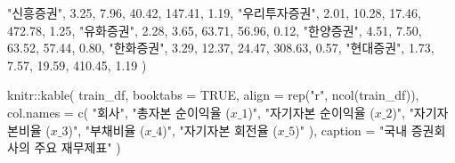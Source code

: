 \documentclass[
]{book}
\newenvironment{Shaded}{\begin{snugshade}}{\end{snugshade}}
\newcommand{\AttributeTok}[1]{\textcolor[rgb]{0.77,0.63,0.00}{#1}}
\newcommand{\ConstantTok}[1]{\textcolor[rgb]{0.00,0.00,0.00}{#1}}
\newcommand{\FloatTok}[1]{\textcolor[rgb]{0.00,0.00,0.81}{#1}}
\newcommand{\FunctionTok}[1]{\textcolor[rgb]{0.00,0.00,0.00}{#1}}
\newcommand{\NormalTok}[1]{#1}
\newcommand{\SpecialCharTok}[1]{\textcolor[rgb]{0.00,0.00,0.00}{#1}}
\newcommand{\StringTok}[1]{\textcolor[rgb]{0.31,0.60,0.02}{#1}}
\begin{document}
\begin{Shaded}
\begin{Highlighting}[]
  \StringTok{"신흥증권"}\NormalTok{, }\FloatTok{3.25}\NormalTok{, }\FloatTok{7.96}\NormalTok{, }\FloatTok{40.42}\NormalTok{, }\FloatTok{147.41}\NormalTok{, }\FloatTok{1.19}\NormalTok{,}
  \StringTok{"우리투자증권"}\NormalTok{, }\FloatTok{2.01}\NormalTok{, }\FloatTok{10.28}\NormalTok{, }\FloatTok{17.46}\NormalTok{, }\FloatTok{472.78}\NormalTok{, }\FloatTok{1.25}\NormalTok{,}
  \StringTok{"유화증권"}\NormalTok{, }\FloatTok{2.28}\NormalTok{, }\FloatTok{3.65}\NormalTok{, }\FloatTok{63.71}\NormalTok{, }\FloatTok{56.96}\NormalTok{, }\FloatTok{0.12}\NormalTok{,}
  \StringTok{"한양증권"}\NormalTok{, }\FloatTok{4.51}\NormalTok{, }\FloatTok{7.50}\NormalTok{, }\FloatTok{63.52}\NormalTok{, }\FloatTok{57.44}\NormalTok{, }\FloatTok{0.80}\NormalTok{,}
  \StringTok{"한화증권"}\NormalTok{, }\FloatTok{3.29}\NormalTok{, }\FloatTok{12.37}\NormalTok{, }\FloatTok{24.47}\NormalTok{, }\FloatTok{308.63}\NormalTok{, }\FloatTok{0.57}\NormalTok{,}
  \StringTok{"현대증권"}\NormalTok{, }\FloatTok{1.73}\NormalTok{, }\FloatTok{7.57}\NormalTok{, }\FloatTok{19.59}\NormalTok{, }\FloatTok{410.45}\NormalTok{, }\FloatTok{1.19}
\NormalTok{)}

\NormalTok{knitr}\SpecialCharTok{::}\FunctionTok{kable}\NormalTok{(}
\NormalTok{  train\_df, }\AttributeTok{booktabs =} \ConstantTok{TRUE}\NormalTok{,}
  \AttributeTok{align =} \FunctionTok{rep}\NormalTok{(}\StringTok{"r"}\NormalTok{, }\FunctionTok{ncol}\NormalTok{(train\_df)),}
  \AttributeTok{col.names =} \FunctionTok{c}\NormalTok{(}
    \StringTok{"회사"}\NormalTok{,}
    \StringTok{"총자본 순이익율 ($x\_1$)"}\NormalTok{,}
    \StringTok{"자기자본 순이익율 ($x\_2$)"}\NormalTok{,}
    \StringTok{"자기자본비율 ($x\_3$)"}\NormalTok{,}
    \StringTok{"부채비율 ($x\_4$)"}\NormalTok{,}
    \StringTok{"자기자본 회전율 ($x\_5$)"}
\NormalTok{  ),}
  \AttributeTok{caption =} \StringTok{"국내 증권회사의 주요 재무제표"}
\NormalTok{)}
\end{Highlighting}
\end{Shaded}
\end{document}
